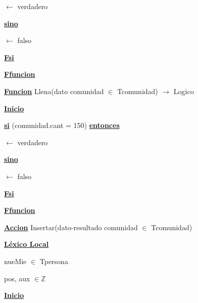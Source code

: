 \documentclass{article}
\begin{document}
                \hspace{16mm}$\leftarrow$ verdadero

            \hspace{12mm}\underline{\textbf{sino}}

                \hspace{16mm}$\leftarrow$ falso

        \hspace{12mm}\underline{\textbf{Fsi}}

    \hspace{4mm}\underline{\textbf{Ffuncion}}

    \vspace{4mm}

    \hspace{4mm}\underline{\textbf{Funcion}} Llena(dato comunidad $\in$ Tcomunidad) $\rightarrow$ Logico

        \hspace{8mm}\underline{\textbf{Inicio}}

            \hspace{12mm}\underline{\textbf{si}} (comunidad.cant = 150) \underline{\textbf{entonces}}

                \hspace{16mm}$\leftarrow$ verdadero

            \hspace{12mm}\underline{\textbf{sino}}

                \hspace{16mm}$\leftarrow$ falso

            \hspace{12mm}\underline{\textbf{Fsi}}

    \hspace{4mm}\underline{\textbf{Ffuncion}}

    \vspace{4mm}

    \hspace{4mm}\underline{\textbf{Accion}} Insertar(dato-resultado comunidad $\in$ Tcomunidad)

        \hspace{8mm}\underline{\textbf{Léxico Local}}

            \hspace{12mm}nueMie $\in$ Tpersona

            \hspace{12mm}pos, aux $\in \mathbb{Z}$

        \hspace{8mm}\underline{\textbf{Inicio}}
\end{document}
